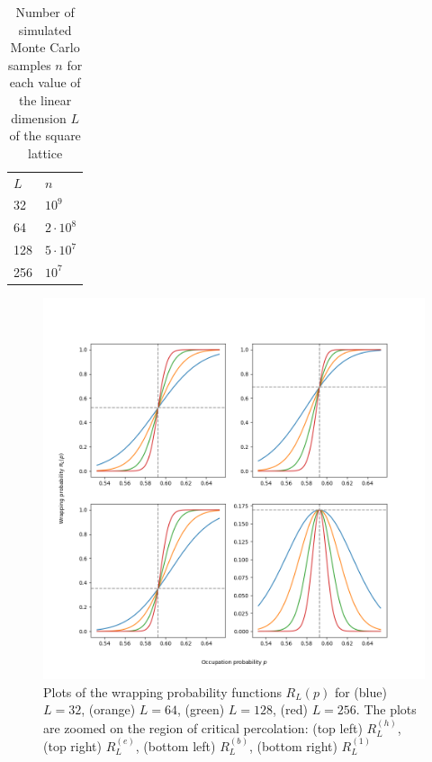 \begin{table}[!htbp]
	\centering
		\begin{tabular}{ll}
		$L$ & $n$           \\
		32  & $10^9$        \\
		64  & $2\cdot 10^8$ \\
		128 & $5\cdot 10^7$ \\
		256 & $10^7$       	
		\end{tabular}
	\caption{\label{table:samples} Number of simulated Monte Carlo samples $n$ for each value of the linear dimension $L$ of the square lattice}
\end{table}

\begin{figure}
	\centering
		\includegraphics[width=\linewidth]{../plots/plot1}
		\caption{\label{fig:plot1} Plots of the wrapping probability functions $R_L(p)$ for (blue) $L=32$, (orange) $L=64$, (green) $L=128$, (red) $L=256$. The plots are zoomed on the region of critical percolation: (top left) $R_L^{(h)}$, (top right) $R_L^{(e)}$, (bottom left) $R_L^{(b)}$, (bottom right) $R_L^{(1)}$}
\end{figure}
